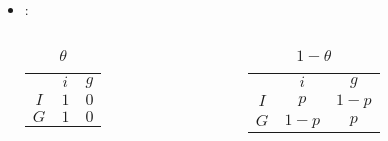 \documentclass{beamer}
\begin{document}


\maketitle

\begin{frame}{}
\begin{itemize}
    \item :
    \begin{columns}[totalwidth=.9\textwidth]
        \begin{column}{.4\textwidth}
            \begin{table}
                \begin{tabular}{c|c|c|}
                    \multicolumn{1}{c}{} & \multicolumn{1}{c}{$i$} & \multicolumn{1}{c}{$g$} \\\cline{2-3}
                    $I$ & $1$ & $0$ \\\cline{2-3}
                    $G$ & $1$ & $0$ \\\cline{2-3}
        \end{tabular}
        \caption{$\theta$}
       \end{table}
        \end{column}
        \begin{column}{.4\textwidth}
            \begin{table}
                \begin{tabular}{c|c|c|}
                    \multicolumn{1}{c}{} & \multicolumn{1}{c}{$i$} & \multicolumn{1}{c}{$g$} \\\cline{2-3}
                    $I$ & $p$ & $1-p$ \\\cline{2-3}
                    $G$ & $1-p$ & $p$ \\\cline{2-3}
        \end{tabular}
        \caption{$1-\theta$}
       \end{table}
        \end{column}        
    \end{columns}
\end{itemize}
\end{frame}
\end{document}

